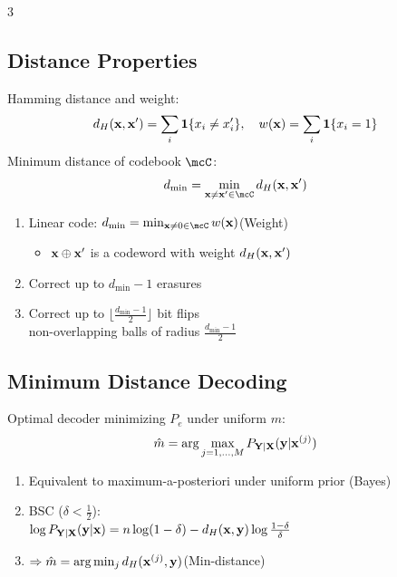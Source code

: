 \documentclass[12pt, a4paper]{article}
\begin{document}
\begin{multicols*}{3}
\subsection{Distance Properties}
Hamming distance and weight:
\begin{align*}
  d_H(\mathbf{x},\mathbf{x}')=\sum_i\mathbf{1}{\{x_i\neq x'_i\}},\quad w(\mathbf{x})=\sum_i\mathbf{1}{\{x_i=1\}}
\end{align*}
Minimum distance of codebook $\mcC$:
\begin{align*}
  d_{\min}=\min_{\bx\neq\bx'\in\mcC}d_H(\bx,\bx')
\end{align*}
\begin{enumerate}[\roman*.]
  \item Linear code: $d_{\min}=\min_{\bx\neq 0\in\mcC}w(\bx)$\hfill(Weight)
    \begin{itemize}[leftmargin=*]\vspace{3pt}
      \item $\mathbf{x}\oplus\mathbf{x}'$ is a codeword with weight $d_H(\mathbf{x},\mathbf{x}')$
    \end{itemize}
  \item Correct up to $d_{\min}-1$ erasures
  \item Correct up to $\lfloor\tfrac{d_{\min}-1}{2}\rfloor$ bit flips\\non-overlapping balls of radius $\tfrac{d_{\min}-1}{2}$
\end{enumerate}

\subsection{Minimum Distance Decoding}
Optimal decoder minimizing $P_e$ under uniform $m$:
\begin{align*}
  \hat m=\arg\max_{j=1,\dots,M}P_{\mathbf{Y}|\mathbf{X}}(\mathbf{y}|\mathbf{x}^{(j)})
\end{align*}
\begin{enumerate}[\roman*.]
  \item Equivalent to maximum-a-posteriori under uniform prior (Bayes)
  \item BSC ($\delta<\tfrac12$):\\$\log P_{\mathbf{Y}|\mathbf{X}}(\mathbf{y}|\mathbf{x})=n\log(1-\delta)-d_H(\mathbf{x},\mathbf{y})\log\tfrac{1-\delta}{\delta}$
  \item $\Rightarrow\hat m=\arg\min_j d_H(\mathbf{x}^{(j)},\mathbf{y})$\hfill(Min-distance)
\end{enumerate}


\end{multicols*}
\end{document}
